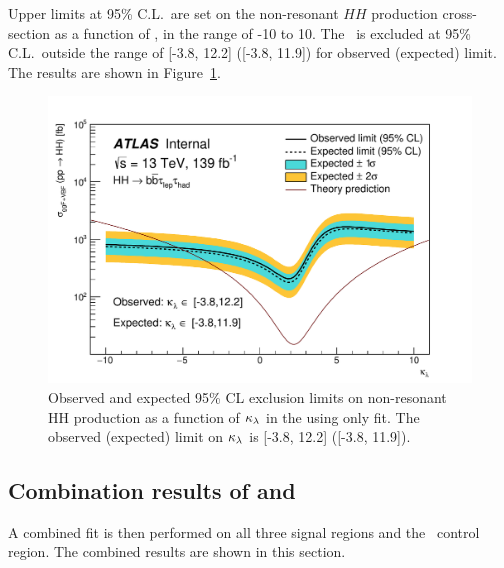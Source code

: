 





Upper limits at 95\% C.L.\ are set on the non-resonant $HH$ production cross-section as a function of \kl,
in the range of -10 to 10.
The \kl\ is excluded at 95\% C.L.\ outside the range of [-3.8, 12.2] ([-3.8, 11.9]) for observed (expected) limit.
The results are shown in  Figure~\ref{fig:bbtautau_subklscans}.


\begin{figure}[htbp]
\begin{center}
    \includegraphics[width=.8\textwidth]{DiHiggs/plots/kl_scan/bbtautauSubchannels/bbtautau_lephad_kl_scan.pdf}
\end{center}
\caption{Observed and expected 95\% CL exclusion limits on non-resonant 
HH production as a function of $\kappa_{\lambda}$ in the 
using \lephad only fit.
The observed (expected) limit on $\kappa_{\lambda}$ is 
[-3.8, 12.2] ([-3.8, 11.9]).}
\label{fig:bbtautau_subklscans}
\end{figure}


\newpage

\subsection{Combination results of \lephad and \hadhad}

\label{sec:DiHiggs:combination-bbtautau}
A combined fit is then performed on all three signal regions and the \ZHF\ control region.
The combined results are shown in this section. 



